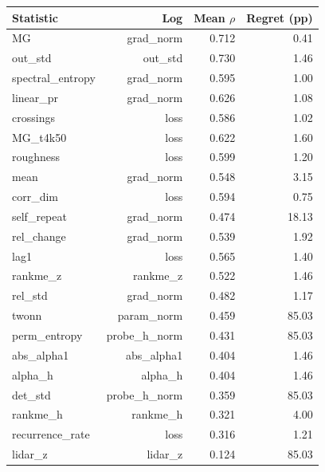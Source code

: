 \begin{tabular}{lrrr}
\toprule
Statistic & Log & Mean $\rho$ & Regret (pp) \\
\midrule
MG & grad\_norm & 0.712 & 0.41 \\
out\_std & out\_std & 0.730 & 1.46 \\
spectral\_entropy & grad\_norm & 0.595 & 1.00 \\
linear\_pr & grad\_norm & 0.626 & 1.08 \\
crossings & loss & 0.586 & 1.02 \\
MG\_t4k50 & loss & 0.622 & 1.60 \\
roughness & loss & 0.599 & 1.20 \\
mean & grad\_norm & 0.548 & 3.15 \\
corr\_dim & loss & 0.594 & 0.75 \\
self\_repeat & grad\_norm & 0.474 & 18.13 \\
rel\_change & grad\_norm & 0.539 & 1.92 \\
lag1 & loss & 0.565 & 1.40 \\
rankme\_z & rankme\_z & 0.522 & 1.46 \\
rel\_std & grad\_norm & 0.482 & 1.17 \\
twonn & param\_norm & 0.459 & 85.03 \\
perm\_entropy & probe\_h\_norm & 0.431 & 85.03 \\
abs\_alpha1 & abs\_alpha1 & 0.404 & 1.46 \\
alpha\_h & alpha\_h & 0.404 & 1.46 \\
det\_std & probe\_h\_norm & 0.359 & 85.03 \\
rankme\_h & rankme\_h & 0.321 & 4.00 \\
recurrence\_rate & loss & 0.316 & 1.21 \\
lidar\_z & lidar\_z & 0.124 & 85.03 \\
\bottomrule
\end{tabular}
